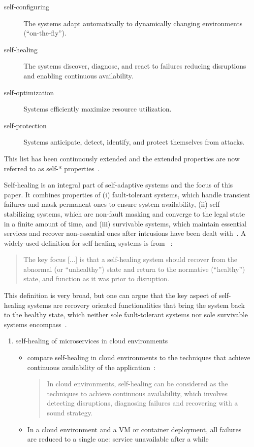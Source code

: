   \begin{description}
    \item[self-configuring] The systems adapt automatically to dynamically changing environments (\enquote{on-the-fly}).
    \item[self-healing] The systems discover, diagnose, and react to failures reducing disruptions and enabling continuous availability.
    \item[self-optimization] Systems efficiently maximize resource utilization.
    \item[self-protection] Systems anticipate, detect, identify, and protect themselves from attacks.
  \end{description}

  This list has been continuously extended and the extended properties are now referred to as self-* properties~\cite{PsaierSurvey}.

  Self-healing is an integral part of self-adaptive systems and the focus of this paper.
  It combines properties of
  (i) fault-tolerant systems, which handle transient failures and mask permanent ones to ensure system availability,
  (ii) self-stabilizing systems, which are non-fault masking and converge to the legal state in a finite amount of time, and 
  (iii) survivable systems, which maintain essential services and recover non-essential ones after intrusions have been dealt with~\cite{PsaierSurvey}.
  A widely-used definition for self-healing systems is from \citeauthor{Ghosh}~\cite{Ghosh}:

  \begin{quote}
    The key focus [...] is that a self-healing system should recover from the abnormal (or \enquote{unhealthy}) state and return to the normative (\enquote{healthy}) state, and function as it was prior to disruption.
  \end{quote}

  This definition is very broad, but one can argue that the key aspect of self-healing systems are recovery oriented functionalities that bring the system back to the healthy state, which neither sole fault-tolerant systems nor sole survivable systems encompass~\cite{PsaierSurvey}.


\begin{enumerate}
  \item self-healing of microservices in cloud environments
  \begin{itemize}
    \item \citeauthor{PsaierSurvey} compare self-healing in cloud environments to the techniques that achieve continuous availability of the application~\cite{PsaierSurvey}:
    \begin{quote}
      In cloud environments, self-healing can be considered as the techniques to achieve continuous availability, which involves detecting disruptions, diagnosing failures and recovering with a sound strategy.
    \end{quote}
    \item In a cloud environment and a VM or container deployment, all failures are reduced to a single one: service unavailable after a while
  \end{itemize}
\end{enumerate}